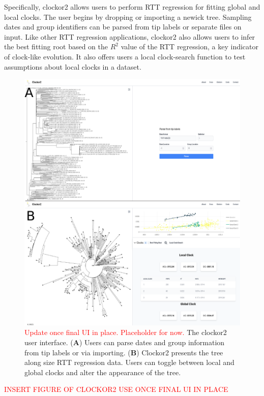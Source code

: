 \documentclass{article}
\begin{document}
Specifically, clockor2 allows users to perform RTT regression for fitting global and local clocks. The user begins by dropping or importing a newick tree. Sampling dates and group identifiers can be parsed from tip labels or separate files on input. Like other RTT regression applications, clockor2 also allows users to infer the best fitting root based on the $R^2$ value of the RTT regression, a key indicator of clock-like evolution. It also offers users a local clock-search function to test assumptions about local clocks in a dataset. 

\begin{figure}[H]
\centering
\includegraphics[width = 1\linewidth]{figures/clockor2UI.pdf}
\caption{\textcolor{red}{Update once final UI in place. Placeholder for now.} The clockor2 user interface. (\textbf{A}) Users can parse dates and group information from tip labels or via importing. (\textbf{B}) Clockor2 presents the tree along size RTT regression data. Users can toggle between local and global clocks and alter the appearance of the tree.}
\label{fig:ui}
\end{figure}

\textcolor{red}{INSERT FIGURE OF CLOCKOR2 USE ONCE FINAL UI IN PLACE}
\end{document}
